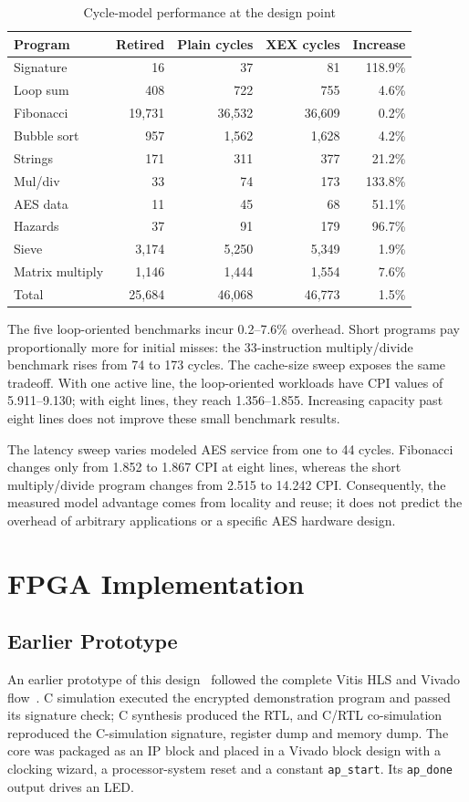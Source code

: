\documentclass[conference,a4paper]{IEEEtran}
\begin{document}
\begin{table}[t]
\caption{Cycle-model performance at the design point}
\label{tab:performance}
\centering
\small
\begin{tabular}{@{}lrrrr@{}}
\toprule
Program & Retired & Plain cycles & XEX cycles & Increase \\
\midrule
Signature & 16 & 37 & 81 & 118.9\% \\
Loop sum & 408 & 722 & 755 & 4.6\% \\
Fibonacci & 19,731 & 36,532 & 36,609 & 0.2\% \\
Bubble sort & 957 & 1,562 & 1,628 & 4.2\% \\
Strings & 171 & 311 & 377 & 21.2\% \\
Mul/div & 33 & 74 & 173 & 133.8\% \\
AES data & 11 & 45 & 68 & 51.1\% \\
Hazards & 37 & 91 & 179 & 96.7\% \\
Sieve & 3,174 & 5,250 & 5,349 & 1.9\% \\
Matrix multiply & 1,146 & 1,444 & 1,554 & 7.6\% \\
\midrule
Total & 25,684 & 46,068 & 46,773 & 1.5\% \\
\bottomrule
\end{tabular}
\end{table}

The five loop-oriented benchmarks incur 0.2--7.6\% overhead. Short programs
pay proportionally more for initial misses: the 33-instruction multiply/divide
benchmark rises from 74 to 173 cycles. The cache-size sweep exposes the same
tradeoff. With one active line, the loop-oriented workloads have CPI values
of 5.911--9.130; with eight lines, they reach 1.356--1.855. Increasing capacity
past eight lines does not improve these small benchmark results.

The latency sweep varies modeled AES service from one to 44 cycles. Fibonacci
changes only from 1.852 to 1.867 CPI at eight lines, whereas the short
multiply/divide program changes from 2.515 to 14.242 CPI. Consequently, the
measured model advantage comes from locality and reuse; it does not predict
the overhead of arbitrary applications or a specific AES hardware design.

\section{FPGA Implementation}
\subsection{Earlier Prototype}
An earlier prototype of this design~\cite{thesis} followed the complete Vitis HLS and Vivado
flow~\cite{hls,vivado}. C simulation executed the encrypted demonstration
program and passed its signature check; C synthesis produced the RTL, and
C/RTL co-simulation reproduced the C-simulation signature, register dump and
memory dump. The core was packaged as an IP block and placed in a Vivado
block design with a clocking wizard, a processor-system reset and a constant
\texttt{ap\_start}. Its \texttt{ap\_done} output drives an LED.
\end{document}
